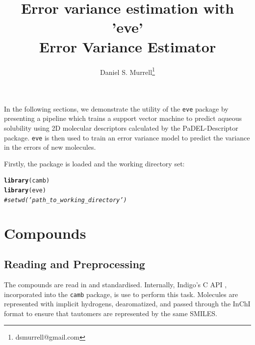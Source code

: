 \documentclass[twoside,a4wide,12pt]{article}\usepackage[]{graphicx}\usepackage[]{color}
\title{Error variance estimation with 'eve'\\
{\bf E}rror {\bf V}ariance {\bf E}stimator\\
}
\author[1]{\rm Daniel S. Murrell\thanks{dsmurrell@gmail.com}}
\affil[1]{Unilever Centre for Molecular Science Informatics, Department of Chemistry, University of Cambridge, Cambridge, United Kingdom.}
\makeatletter
\newcommand{\hlcom}[1]{\textcolor[rgb]{0.678,0.584,0.686}{\textit{#1}}}%
\newcommand{\hlstd}[1]{\textcolor[rgb]{0.345,0.345,0.345}{#1}}%
\newcommand{\hlkwd}[1]{\textcolor[rgb]{0.737,0.353,0.396}{\textbf{#1}}}%
\newenvironment{kframe}{%
 \def\at@end@of@kframe{}%
 \ifinner\ifhmode%
  \def\at@end@of@kframe{\end{minipage}}%
  \begin{minipage}{\columnwidth}%
 \fi\fi%
 \def\FrameCommand##1{\hskip\@totalleftmargin \hskip-\fboxsep
 \colorbox{shadecolor}{##1}\hskip-\fboxsep
     \hskip-\linewidth \hskip-\@totalleftmargin \hskip\columnwidth}%
 \MakeFramed {\advance\hsize-\width
   \@totalleftmargin\z@ \linewidth\hsize
   \@setminipage}}%
 {\par\unskip\endMakeFramed%
 \at@end@of@kframe}
\newenvironment{knitrout}{}{} %
\makeatother
\begin{document}
\maketitle
\onehalfspacing



\maketitle

In the following sections, we demonstrate the utility of the \texttt{eve} \cite{eve} package by presenting a pipeline which trains a support vector machine to predict aqueous solubility using 2D molecular descriptors calculated by the PaDEL-Descriptor package. \texttt{eve} is then used to train an error variance model to predict the variance in the errors of new molecules.

Firstly, the package is loaded and the working directory set:

\begin{knitrout}
\color{fgcolor}\begin{kframe}
\begin{alltt}
\hlkwd{library}\hlstd{(camb)}
\hlkwd{library}\hlstd{(eve)}
\hlcom{# setwd('path_to_working_directory')}
\end{alltt}
\end{kframe}
\end{knitrout}

\section{Compounds}

\subsection{Reading and Preprocessing}
The compounds are read in and standardised. Internally, Indigo's C API \cite{Indigo}, incorporated into the \texttt{camb} package, is use to perform this task.
Molecules are represented with implicit hydrogens, dearomatized, and passed through the InChI format to ensure that tautomers are represented by the same SMILES.
\end{document}
